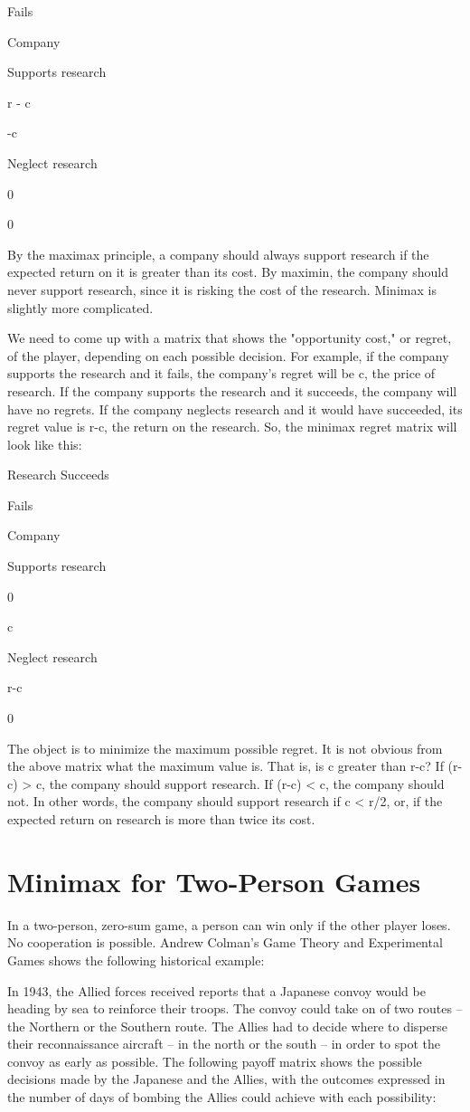 Fails

Company

Supports research

r - c

-c

Neglect research

0

0


By the maximax principle, a company should always support research if the expected return on it is greater than its cost. By maximin, the company should never support research, since it is risking the cost of the research. Minimax is slightly more complicated.

We need to come up with a matrix that shows the "opportunity cost," or regret, of the player, depending on each possible decision. For example, if the company supports the research and it fails, the company's regret will be c, the price of research. If the company supports the research and it succeeds, the company will have no regrets. If the company neglects research and it would have succeeded, its regret value is r-c, the return on the research. So, the minimax regret matrix will look like this:

Research
Succeeds

Fails

Company

Supports research

0

c

Neglect research

r-c

0


The object is to minimize the maximum possible regret. It is not obvious from the above matrix what the maximum value is. That is, is c greater than r-c? If (r-c) > c, the company should support research. If (r-c) < c, the company should not. In other words, the company should support research if c < r/2, or, if the expected return on research is more than twice its cost.

\section{Minimax for Two-Person Games}

In a two-person, zero-sum game, a person can win only if the other player loses. No cooperation is possible. Andrew Colman's Game Theory and Experimental Games shows the following historical example:

In 1943, the Allied forces received reports that a Japanese convoy would be heading by sea to reinforce their troops. The convoy could take on of two routes -- the Northern or the Southern route. The Allies had to decide where to disperse their reconnaissance aircraft -- in the north or the south -- in order to spot the convoy as early as possible. The following payoff matrix shows the possible decisions made by the Japanese and the Allies, with the outcomes expressed in the number of days of bombing the Allies could achieve with each possibility:


